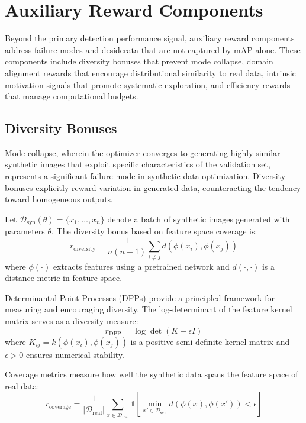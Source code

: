 \section{Auxiliary Reward Components}
\label{sec:auxiliary_rewards}

Beyond the primary detection performance signal, auxiliary reward components address failure modes and desiderata that are not captured by mAP alone. These components include diversity bonuses that prevent mode collapse, domain alignment rewards that encourage distributional similarity to real data, intrinsic motivation signals that promote systematic exploration, and efficiency rewards that manage computational budgets.

\subsection{Diversity Bonuses}

Mode collapse, wherein the optimizer converges to generating highly similar synthetic images that exploit specific characteristics of the validation set, represents a significant failure mode in synthetic data optimization. Diversity bonuses explicitly reward variation in generated data, counteracting the tendency toward homogeneous outputs.

Let $\mathcal{D}_{\text{syn}}(\theta) = \{x_1, \ldots, x_n\}$ denote a batch of synthetic images generated with parameters $\theta$. The diversity bonus based on feature space coverage is:
\begin{equation}
r_{\text{diversity}} = \frac{1}{n(n-1)} \sum_{i \neq j} d(\phi(x_i), \phi(x_j))
\label{eq:diversity_bonus}
\end{equation}
where $\phi(\cdot)$ extracts features using a pretrained network and $d(\cdot, \cdot)$ is a distance metric in feature space.

Determinantal Point Processes (DPPs) provide a principled framework for measuring and encouraging diversity. The log-determinant of the feature kernel matrix serves as a diversity measure:
\begin{equation}
r_{\text{DPP}} = \log \det(K + \epsilon I)
\label{eq:dpp_diversity}
\end{equation}
where $K_{ij} = k(\phi(x_i), \phi(x_j))$ is a positive semi-definite kernel matrix and $\epsilon > 0$ ensures numerical stability.

Coverage metrics measure how well the synthetic data spans the feature space of real data:
\begin{equation}
r_{\text{coverage}} = \frac{1}{|\mathcal{D}_{\text{real}}|} \sum_{x \in \mathcal{D}_{\text{real}}} \mathbb{1}\left[ \min_{x' \in \mathcal{D}_{\text{syn}}} d(\phi(x), \phi(x')) < \epsilon \right]
\label{eq:coverage_reward}
\end{equation}

